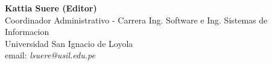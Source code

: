 \begin{center}
\textbf{Kattia Suere (Editor)} \\
Coordinador Administrativo - Carrera Ing. Software e Ing. Sistemas de Informacion \\
Universidad San Ignacio de Loyola \\
email: \textit{lsuere@usil.edu.pe} \\
\end{center}
